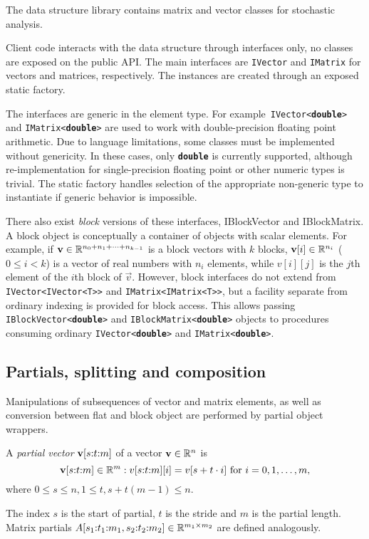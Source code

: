 The data structure library contains matrix and vector classes for
stochastic analysis.

Client code interacts with the data structure through interfaces only,
no classes are exposed on the public API. The main interfaces are
\texttt{IVector} and \texttt{IMatrix} for vectors and matrices,
respectively. The instances are created through an exposed static
factory.

The interfaces are generic in the element type. For
example~\texttt{IVector<\textbf{double}>} and
\texttt{IMatrix<\textbf{double}>} are used to work with
double-precision floating point arithmetic. Due to language
limitations, some classes must be implemented without genericity. In
these cases, only \texttt{\textbf{double}} is currently supported,
although re-implementation for single-precision floating point or
other numeric types is trivial. The static factory handles selection
of the appropriate non-generic type to instantiate if generic behavior
is impossible.

There also exist \emph{block} versions of these interfaces,
IBlockVector and IBlockMatrix. A block object is conceptually a
container of objects with scalar elements. For example, if
$\bm{\mathrm{v}} \in \mathbb{R}^{n_0 + n_1 + \cdots + n_{k - 1}}$ is a block vectors
with $k$ blocks, $\bm{\mathrm{v}}[i] \in \mathbb{R}^{n_i}$ ($0 \le i < k$) is a
vector of real numbers with $n_i$ elements, while $v[i][j]$ is the
$j$th element of the $i$th block of $\vec{v}$. However, block
interfaces do not extend from \texttt{IVector<IVector<T>>} and
\texttt{IMatrix<IMatrix<T>>}, but a facility separate from ordinary
indexing is provided for block access. This allows passing
\texttt{IBlockVector<\textbf{double}>} and
\texttt{IBlockMatrix<\textbf{double}>} objects to procedures consuming
ordinary \texttt{IVector<\textbf{double}>} and
\texttt{IMatrix<\textbf{double}>}.

\subsection{Partials, splitting and composition}

Manipulations of subsequences of vector and matrix elements, as well
as conversion between flat and block object are performed by partial
object wrappers.

\begin{dfn}
  A \emph{partial vector} $\bm{\mathrm{v}}[s{:}t{:}m]$ of a vector
  $\bm{\mathrm{v}} \in \mathbb{R}^n$ is
  \begin{equation}
    \bm{\mathrm{v}}[s{:}t{:}m] \in \mathbb{R}^m : v[s{:}t{:}m][i] =
    v[s + t \cdot i] \text{ for $i = 0, 1, \ldots, m$,}
  \end{equation}
  where $0 \le s \le n, 1 \le t, s + t (m - 1) \le n$.
\end{dfn}
The index $s$ is the start of partial, $t$ is the stride and $m$ is
the partial length. Matrix partials
$A[s_1{:}t_1{:}m_1, s_2{:}t_2{:}m_2] \in \mathbb{R}^{m_1 \times
  m_2}$ are defined analogously.

